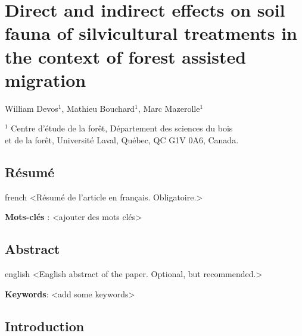 \chapter{Direct and indirect effects on soil fauna of silvicultural treatments in the context of forest assisted migration}     %
\label{chapitre1-articles}    

William Devos$^1$, Mathieu Bouchard$^1$, Marc Mazerolle$^1$

$^1$ Centre d'étude de la forêt, Département des sciences du bois \\ 
et de la forêt, Université Laval, Québec, QC G1V 0A6, Canada. \\ 

\clearpage

\section*{Résumé}
\label{sec:resume1}

\begin{otherlanguage*}{french}
  <Résumé de l'article en français. Obligatoire.>

  \textbf{Mots-clés} : <ajouter des mots clés>
\end{otherlanguage*}

\clearpage

\section*{Abstract}
\label{sec:abstract1}

\begin{otherlanguage*}{english}
  <English abstract of the paper. Optional, but recommended.>

\textbf{Keywords}: <add some keywords> 
\end{otherlanguage*}

\cleardoublepage

\section*{Introduction}
\label{sec:intro1}


